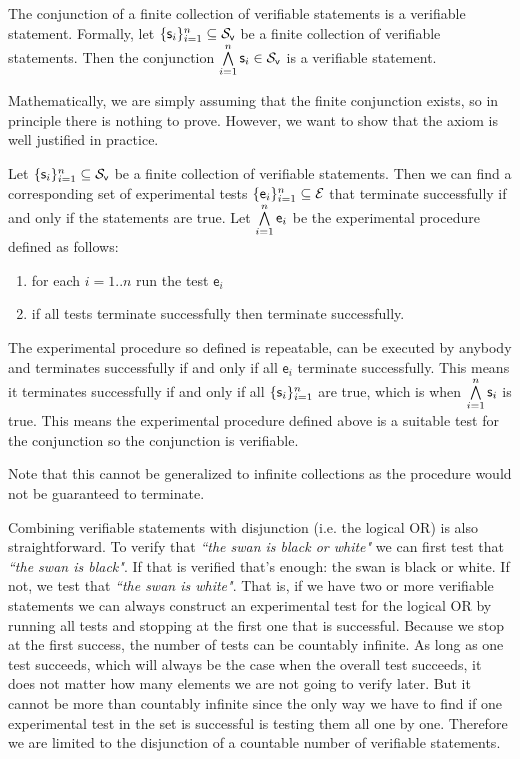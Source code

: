 \documentclass[11pt,letterpaper,fleqn]{memoir} %
\begin{document}
\begin{mathSection}
	\begin{axiom}\label{ax_verifiable_AND}
	The conjunction of a finite collection of verifiable statements is a verifiable statement. Formally, let $\{\mathsf{s}_i\}_{i=1}^{n} \subseteq \mathcal{S}_\textsf{v}$ be a finite collection of verifiable statements. Then the conjunction $\bigwedge\limits_{i=1}^{n} \mathsf{s}_i \in \mathcal{S}_\textsf{v}$ is a verifiable statement.
	\end{axiom}
	\begin{justification}
		Mathematically, we are simply assuming that the finite conjunction exists, so in principle there is nothing to prove. However, we want to show that the axiom is well justified in practice.
		
		Let $\{\mathsf{s}_i\}_{i=1}^{n} \subseteq \mathcal{S}_\textsf{v}$ be a finite collection of verifiable statements. Then we can find a corresponding set of experimental tests $\{\mathsf{e}_i\}_{i=1}^{n} \subseteq \mathcal{E}$ that terminate successfully if and only if the statements are true. Let $\bigwedge\limits_{i=1}^{n} \mathsf{e}_i$ be the experimental procedure defined as follows:
		\begin{enumerate}
			\item for each $i=1..n$ run the test $\mathsf{e}_i$
			\item if all tests terminate successfully then terminate successfully.
		\end{enumerate}
		The experimental procedure so defined is repeatable, can be executed by anybody and terminates successfully if and only if all $\mathsf{e}_i$ terminate successfully. This means it terminates successfully if and only if all $\{\mathsf{s}_i\}_{i=1}^{n}$ are true, which is when $\bigwedge\limits_{i=1}^{n} \mathsf{s}_i$ is true. This means the experimental procedure defined above is a suitable test for the conjunction so the conjunction is verifiable.
		
		Note that this cannot be generalized to infinite collections as the procedure would not be guaranteed to terminate.
	\end{justification}
\end{mathSection}	

Combining verifiable statements with disjunction (i.e. the logical OR) is also straightforward. To verify that \emph{``the swan is black or white"} we can first test that \emph{``the swan is black"}. If that is verified that's enough: the swan is black or white. If not, we test that \emph{``the swan is white"}. That is, if we have two or more verifiable statements we can always construct an experimental test for the logical OR by running all tests and stopping at the first one that is successful. Because we stop at the first success, the number of tests can be countably infinite. As long as one test succeeds, which will always be the case when the overall test succeeds, it does not matter how many elements we are not going to verify later. But it cannot be more than countably infinite since the only way we have to find if one experimental test in the set is successful is testing them all one by one. Therefore we are limited to the disjunction of a countable number of verifiable statements.
\end{document}
